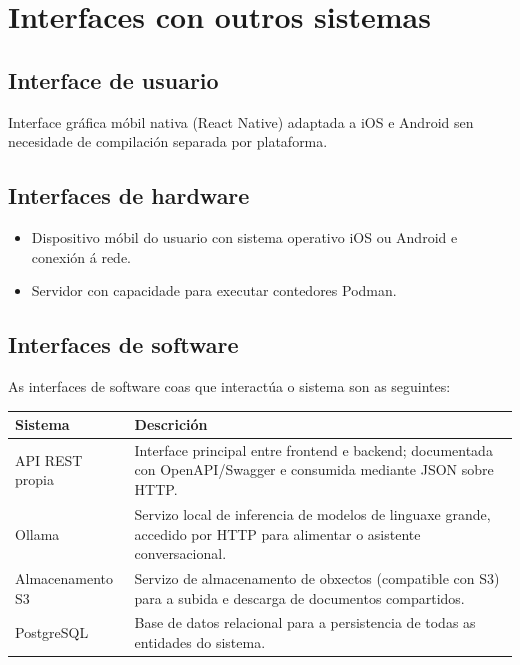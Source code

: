 \section{Interfaces con outros sistemas}

\subsection{Interface de usuario}

Interface gráfica móbil nativa (React Native) adaptada a iOS e Android sen necesidade
de compilación separada por plataforma.

\subsection{Interfaces de hardware}

\begin{itemize}
  \item Dispositivo móbil do usuario con sistema operativo iOS ou Android e conexión á rede.
  \item Servidor con capacidade para executar contedores Podman.
\end{itemize}

\subsection{Interfaces de software}

As interfaces de software coas que interactúa o sistema son as seguintes:

\vspace{0.5em}
\begin{tabularx}{\textwidth}{@{}lX@{}}
  \toprule
  \textbf{Sistema} & \textbf{Descrición} \\
  \midrule
  API REST propia & Interface principal entre frontend e backend; documentada con OpenAPI/Swagger e consumida mediante JSON sobre HTTP. \\
  Ollama          & Servizo local de inferencia de modelos de linguaxe grande, accedido por HTTP para alimentar o asistente conversacional. \\
  Almacenamento S3 & Servizo de almacenamento de obxectos (compatible con S3) para a subida e descarga de documentos compartidos. \\
  PostgreSQL       & Base de datos relacional para a persistencia de todas as entidades do sistema. \\
  \bottomrule
\end{tabularx}

